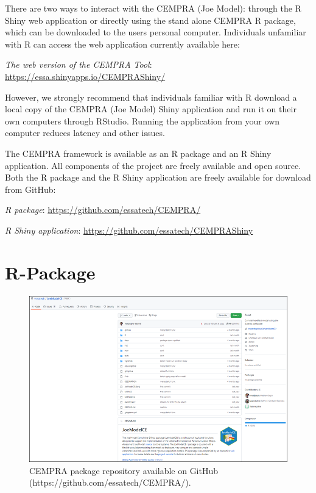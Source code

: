 \documentclass[
  letterpaper,
  DIV=11,
  numbers=noendperiod]{scrreprt}
\begin{document}
There are two ways to interact with the CEMPRA (Joe Model): through the
R Shiny web application or directly using the stand alone CEMPRA R
package, which can be downloaded to the users personal computer.
Individuals unfamiliar with R can access the web application currently
available here:

\emph{The web version of the CEMPRA Tool}:
\url{https://essa.shinyapps.io/CEMPRAShiny/}

However, we strongly recommend that individuals familiar with R download
a local copy of the CEMPRA (Joe Model) Shiny application and run it on
their own computers through RStudio. Running the application from your
own computer reduces latency and other issues.

The CEMPRA framework is available as an R package and an R Shiny
application. All components of the project are freely available and open
source. Both the R package and the R Shiny application are freely
available for download from GitHub:

\emph{R package}: \url{https://github.com/essatech/CEMPRA/}

\emph{R Shiny application}:
\url{https://github.com/essatech/CEMPRAShiny}

\hypertarget{r-package-1}{%
\section{R-Package}\label{r-package-1}}

\begin{figure}

{\centering \includegraphics{images/image010.png}

}

\caption{\label{fig-figure6}CEMPRA package repository available on
GitHub (https://github.com/essatech/CEMPRA/).}

\end{figure}
\end{document}
